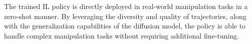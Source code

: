 

The trained IL policy is directly deployed in real-world manipulation tasks in a zero-shot manner. By leveraging the diversity and quality of trajectories, along with the generalization capabilities of the diffusion model, the policy is able to handle complex manipulation tasks without requiring additional fine-tuning.

